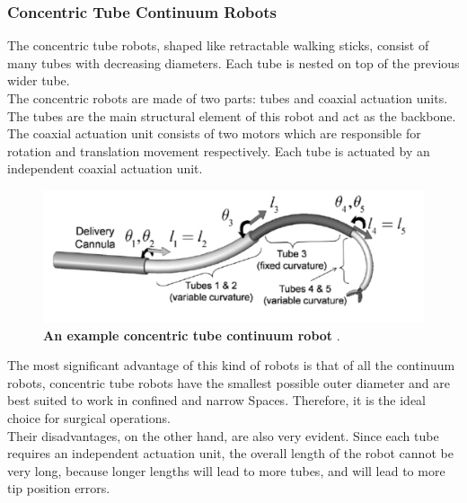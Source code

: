 \subsubsection{Concentric Tube Continuum Robots}
The concentric tube robots, shaped like retractable walking sticks, consist of many tubes with decreasing diameters. Each tube is 
nested on top of the previous wider tube.  \\
The concentric robots are made of two parts: tubes and coaxial actuation units. The tubes are the main structural element of 
this robot and act as the backbone. The coaxial actuation unit consists of two motors which are responsible for rotation and 
translation movement respectively. Each tube is actuated by an independent coaxial actuation unit. 
\begin{figure}[H] %
    \centering 
    \captionsetup{labelsep=colon}
    \includegraphics[width=.8\textwidth]{Image/LR/concentric_tube_CR.PNG} 
    \caption[An example concentric tube continuum robot]
    {\centering \textbf{An example concentric tube continuum robot} \cite{CTCR_example}.}
    \label{fig:CTCR_example}
\end{figure}
\noindent The most significant advantage of this kind of robots is that of all the continuum robots, concentric tube robots have the 
smallest possible outer diameter and are best suited to work in confined and narrow Spaces. Therefore, it is the ideal choice 
for surgical operations. \\
Their disadvantages, on the other hand, are also very evident. Since each tube requires an independent actuation unit, the 
overall length of the robot cannot be very long, because longer lengths will lead to more tubes, and will lead to more tip 
position errors.

\newpage